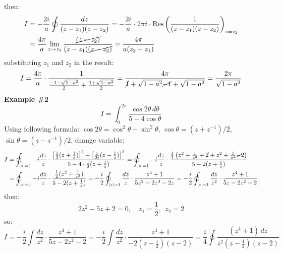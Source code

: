 \documentclass{article}
\begin{document}
\noindent
then:
\begin{align}
        I &= -\frac{2i}{a} \oint \frac{dz}{(z - z_1)(z - z_2)}
= -\frac{2i}{a} \cdot 2\pi i \cdot \operatorname{Res}\left( \frac{1}{(z - z_1)(z - z_2)}\right)_{z=z_2}\\
&= \frac{4\pi}{a} \lim_{z \to z_2} \frac{\cancel{(z - z_2)}}{(z - z_1)\cancel{(z - z_2)}}
= \frac{4\pi}{a(z_2 - z_1)}
\end{align}
substituting $z_1$ and $z_2$ in the result:
\begin{equation}
    I = \frac{4\pi}{a} \cdot \frac{1}{\frac{-1 - \sqrt{1 - a^2}}{2} + \frac{1 + \sqrt{1 - a^2}}{2}} 
= \frac{4\pi}{\cancel{1} + \sqrt{1 - a^2} \cancel{- 1} + \sqrt{1 - a^2}}
= \frac{2\pi}{\sqrt{1 - a^2}}
\end{equation}
\textbf{Example \#2}
\begin{equation}
    I = \int_{0}^{2\pi} \frac{\cos 2\theta \, d\theta}{5 - 4 \cos \theta}
\end{equation}
Using following formula: $\cos 2\theta = \cos ^2 \theta - \sin^2 \theta$, $\cos \theta = (z+z^{-1})/2$, $\sin \theta = (z-z^{-1})/2$. change variable: 
\begin{align*}
    I &= \oint_{|z|=1} -i\frac{ dz}{z} \cdot 
\frac{
\left[\frac{1}{2}(z + \frac{1}{z})\right]^2 - \left[\frac{1}{2i}(z - \frac{1}{z})\right]^2
}{
5 - 4 \cdot \frac{1}{2}(z + \frac{1}{z})
}
= \oint_{|z|=1} -i\frac{ dz}{z} \cdot \frac{\frac{1}{4} \left(z^2 + \frac{1}{z^2} + \cancel{2} + z^2 + \frac{1}{z^2} \cancel{- 2} \right)}{5 - 2(z + \frac{1}{z})}\\
&= \oint_{|z|=1} -i \frac{dz}{z} \cdot \frac{\frac{1}{2}(z^2 + \frac{1}{z^2})}{5 - 2(z + \frac{1}{z})}
= -\frac{i}{2} \oint_{|z|=1} \frac{dz}{z} \cdot \frac{z^4 + 1}{5z^2 - 2z^3 - 2z}
= -\frac{i}{2} \oint_{|z|=1} \frac{dz}{z^2} \cdot \frac{z^4 + 1}{5z - 2z^2 - 2}
\end{align*}
then:
\begin{equation}
    2z^2 - 5z + 2 = 0, \quad z_1 = \frac{1}{2}, \ \ z_2 = 2
\end{equation}
so:
\begin{equation}
    I = -\frac{i}{2} \int \frac{dz}{z^2} \cdot \frac{z^4 + 1}{5z - 2z^2 - 2}
= -\frac{i}{2} \int \frac{dz}{z^2} \cdot \frac{z^4 + 1}{-2(z-\tfrac{1}{2})(z-2)}
= \frac{i}{4} \oint \frac{(z^4 + 1)\,dz}{z^2(z - \tfrac{1}{2})(z - 2)}
\end{equation}
\end{document}
